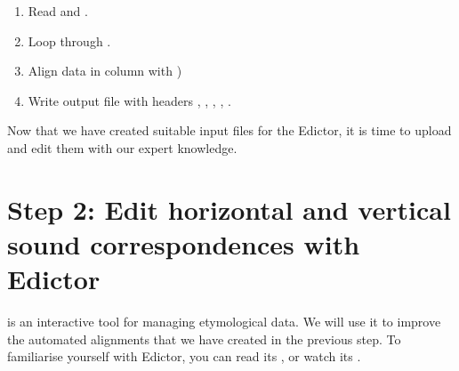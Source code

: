 \documentclass[letterpaper,10pt,english]{sphinxmanual}
\begin{document}
\begin{fulllineitems}
\label{\detokenize{mkedictor:ronataswestoldturkiccommands.maketoedict_ad.run}}
\pysigstartsignatures
{}
\pysigstopsignatures\begin{enumerate}
%
\item {} 
\sphinxAtStartPar
Read  and .

\item {} 
\sphinxAtStartPar
Loop through .

\item {} 
\sphinxAtStartPar
Align data in column  with )

\item {} 
\sphinxAtStartPar
Write output file with headers
, , , , .

\end{enumerate}

\end{fulllineitems}


\sphinxAtStartPar
Now that we have created suitable input files for the Edictor, it is time to
upload and edit them with our expert knowledge.


\section{Step 2: Edit horizontal and vertical sound correspondences with Edictor}
\label{\detokenize{mkedictor:step-2-edit-horizontal-and-vertical-sound-correspondences-with-edictor}}
\sphinxAtStartPar
{} is an interactive tool for managing
etymological data. We will use it to improve the automated alignments that we
have created in the previous step. To familiarise yourself with Edictor, you
can read its ,
 or watch its
.
\end{document}
